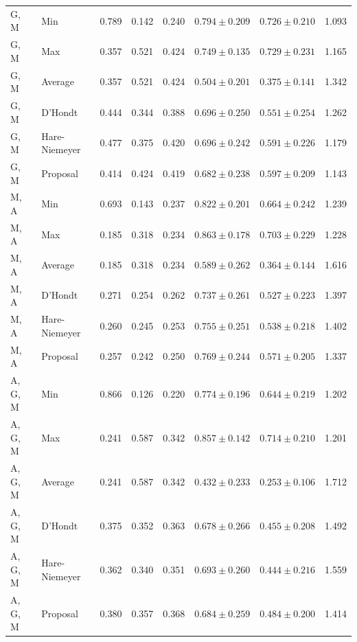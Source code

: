 \begin{table}
{\begin{tabular}{ll|rrr|rrr}
G, M & Min & 0.789 & 0.142 & 0.240 & $0.794 \pm 0.209$ & $0.726 \pm 0.210$ & 1.093 \\
G, M & Max & 0.357 & 0.521 & 0.424 & $0.749 \pm 0.135$ & $0.729 \pm 0.231$ & 1.165 \\
G, M & Average & 0.357 & 0.521 & 0.424 & $0.504 \pm 0.201$ & $0.375 \pm 0.141$ & 1.342 \\
G, M & D'Hondt & 0.444 & 0.344 & 0.388 & $0.696 \pm 0.250$ & $0.551 \pm 0.254$ & 1.262 \\
G, M & Hare-Niemeyer & 0.477 & 0.375 & 0.420 & $0.696 \pm 0.242$ & $0.591 \pm 0.226$ & 1.179 \\
G, M & Proposal & 0.414 & 0.424 & 0.419 & $0.682 \pm 0.238$ & $0.597 \pm 0.209$ & 1.143 \\

M, A & Min & 0.693 & 0.143 & 0.237 & $0.822 \pm 0.201$ & $0.664 \pm 0.242$ & 1.239 \\
M, A & Max & 0.185 & 0.318 & 0.234 & $0.863 \pm 0.178$ & $0.703 \pm 0.229$ & 1.228 \\
M, A & Average & 0.185 & 0.318 & 0.234 & $0.589 \pm 0.262$ & $0.364 \pm 0.144$ & 1.616 \\
M, A & D'Hondt & 0.271 & 0.254 & 0.262 & $0.737 \pm 0.261$ & $0.527 \pm 0.223$ & 1.397 \\
M, A & Hare-Niemeyer & 0.260 & 0.245 & 0.253 & $0.755 \pm 0.251$ & $0.538 \pm 0.218$ & 1.402 \\
M, A & Proposal & 0.257 & 0.242 & 0.250 & $0.769 \pm 0.244$ & $0.571 \pm 0.205$ & 1.337 \\

A, G, M & Min & 0.866 & 0.126 & 0.220 & $0.774 \pm 0.196$ & $0.644 \pm 0.219$ & 1.202 \\
A, G, M & Max & 0.241 & 0.587 & 0.342 & $0.857 \pm 0.142$ & $0.714 \pm 0.210$ & 1.201 \\
A, G, M & Average & 0.241 & 0.587 & 0.342 & $0.432 \pm 0.233$ & $0.253 \pm 0.106$ & 1.712 \\
A, G, M & D'Hondt & 0.375 & 0.352 & 0.363 & $0.678 \pm 0.266$ & $0.455 \pm 0.208$ & 1.492 \\
A, G, M & Hare-Niemeyer & 0.362 & 0.340 & 0.351 & $0.693 \pm 0.260$ & $0.444 \pm 0.216$ & 1.559 \\
A, G, M & Proposal & 0.380 & 0.357 & 0.368 & $0.684 \pm 0.259$ & $0.484 \pm 0.200$ & 1.414 \\

\bottomrule
\end{tabular}}

\bigskip


\end{table}
